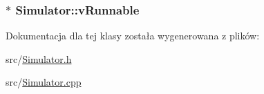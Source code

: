 \hypertarget{class_simulator_a131c2140d1870c403c4b9618ee376007}{
\subsubsection[{v\-Runnable}]{$\ast$ Simulator\-::v\-Runnable\hspace{0.3cm}{\ttfamily [private]}}}\label{class_simulator_a131c2140d1870c403c4b9618ee376007}


Dokumentacja dla tej klasy została wygenerowana z plików\-:\begin{DoxyCompactItemize}
\item 
src/\hyperlink{_simulator_8h}{Simulator.\-h}\item 
src/\hyperlink{_simulator_8cpp}{Simulator.\-cpp}\end{DoxyCompactItemize}
